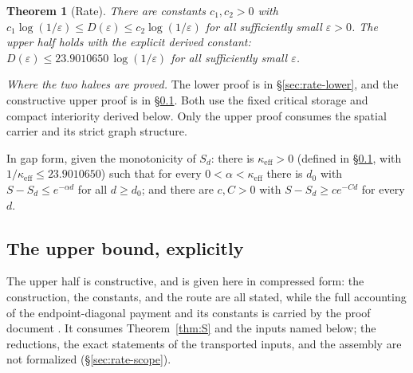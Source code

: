 \documentclass[11pt]{article}
\newtheorem{theorem}{Theorem}
\theoremstyle{remark}
\newcommand{\keff}{\kappa_{\mathrm{eff}}}
\newcommand{\eps}{\varepsilon}
\begin{document}
\begin{theorem}[Rate]\label{thm:rate}
There are constants $c_1,c_2>0$ with
$c_1\log(1/\eps)\le D(\eps)\le c_2\log(1/\eps)$ for all sufficiently
small $\eps>0$. The upper half holds with the explicit derived constant:
$D(\eps)\le 23.9010650\,\log(1/\eps)$ for all sufficiently small
$\eps$.
\end{theorem}

\noindent\emph{Where the two halves are proved.} The lower proof is
in \S\ref{sec:rate-lower}, and the constructive upper proof is in
\S\ref{sec:rate-upper}. Both use the fixed critical storage and compact
interiority derived below. Only the upper proof consumes the spatial
carrier and its strict graph structure.

In gap form, given the monotonicity of $S_d$:
there is $\keff>0$ (defined in \S\ref{sec:rate-upper}, with
$1/\keff\le23.9010650$) such that for every $0<\alpha<\keff$ there is $d_0$
with $S-S_d\le e^{-\alpha d}$ for all $d\ge d_0$; and there are $c,C>0$
with $S-S_d\ge c e^{-Cd}$ for every $d$.



\subsection{The upper bound, explicitly}\label{sec:rate-upper}

The upper half is constructive, and is given here in compressed form: the
construction, the constants, and the route are all stated, while the full
accounting of the endpoint-diagonal payment and its constants is carried
by the proof document \cite{RUB26}. It consumes
Theorem~\ref{thm:S} and the inputs named below; the reductions, the exact
statements of the transported inputs, and the assembly are not formalized
(\S\ref{sec:rate-scope}).
\end{document}
